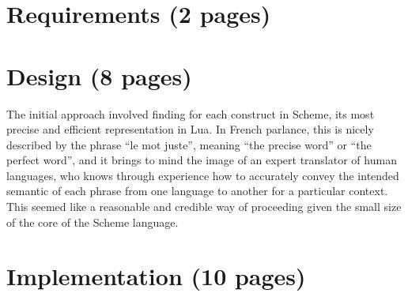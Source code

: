 \section{Requirements (2 pages)}

\section{Design (8 pages)}

The initial approach involved finding for each construct in Scheme, its most
precise and efficient representation in Lua. In French parlance, this is nicely
described by the phrase ``le mot juste'', meaning ``the precise word'' or ``the
perfect word'', and it brings to mind the image of an expert translator of
human languages, who knows through experience how to accurately convey the
intended semantic of each phrase from one language to another for a particular
context.  This seemed like a reasonable and credible way of proceeding given
the small size of the core of the Scheme language.

\section{Implementation (10 pages)}

